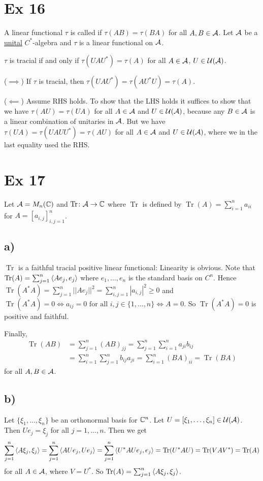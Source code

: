 \documentclass[10pt,english,a4paper]{article}
\theoremstyle{definition}
\let\emph\relax %
\DeclareMathOperator{\Tr}{Tr}
\begin{document}
\section*{Ex 16}
A linear functional $\tau$ is called \emph{tracial} if $\tau(AB)= \tau(BA)$ for
all $A,B \in \mathcal{A}$. Let
$\mathcal{A}$ be a \ul{unital} $C^*$-algebra and $\tau$ is a linear functional on $\mathcal{A}$. 

$\tau$ is tracial if and only if $\tau(UAU^*) = \tau(A)$ for all $A \in \mathcal{A}$,
$U \in \mathcal{U}(\mathcal{A})$.

($\implies$) If $\tau$ is tracial, then $\tau(UAU^*) = \tau(AU^*U)= \tau(A)$.

($\impliedby$) Assume RHS holds. To show that the LHS holds it suffices to 
show that we have $\tau(AU) = \tau(UA)$ for all $A \in \mathcal{A}$ and $U \in \mathcal{U}(\mathcal{A})$,
because any $B\in \mathcal{A}$ is a linear combination of unitaries in $\mathcal{A}$.
But we have $\tau(UA) = \tau(UAUU^*) = \tau(AU)$ for all $A \in \mathcal{A}$ and $U\in \mathcal{U}(\mathcal{A})$,
where we in the last equality used 
the RHS. 

\section*{Ex 17}
Let $\mathcal{A} = M_{n}(\mathbb{C})$ and 
$\Tr\colon \As\to\C$ where $\Tr$ is defined by 
$\Tr(A) = \sum_{i=1}^{n} a_{ii}$ for $A = [a_{i,j}]_{i,j=1}^{n}$.
\subsection*{a)}
$\Tr$ is a faithful tracial positive linear functional: Linearity is obvious.
Note that $\Tr(A)=\sum_{j=1}^{n}\ind{Ae_j,e_j}$ where $e_1,\ldots,e_n$ is the 
standard basis on $C^n$. Hence 
$\Tr(A^*A) = \sum_{j=1}^{n} ||Ae_j||^2 = \sum_{i,j=1}^{n} |a_{i,j}|^2 \geq 0$
and $\Tr(A^*A) = 0 \iff a_{ij}=0 \text{ for all } i,j\in\{1,\ldots,n\} \iff A  = 0$.
So $\Tr(A^*A) = 0$ is positive and faithful. 

Finally, 
\begin{align*}
\Tr(AB)&=\sum_{j=1}^{n} (AB)_{jj} = \sum_{j=1}^{n}\sum_{i=1}^{n}a_{ji}b_{ij} \\&=
\sum_{i=1}^{n}\sum_{j=1}^{n}b_{ij}a_{ji}  = \sum_{i=1}^{n}(BA)_{ii} = \Tr(BA)
\end{align*}
for all $A,B \in \mathcal{A}$.


\subsection*{b)}
Let $\{\xi_1,\ldots, \xi_n\}$ be an orthonormal basis for $\mathbb{C}^n$. Let 
$U = [\xi_1,\ldots, \xi_n] \in \mathcal{U}(\mathcal{A})$. Then $Ue_j = \xi_j$ for all 
$j=1,\ldots,n$. Then we get 
\begin{align*}
    \sum_{j=1}^{n} \ind{A\xi_j,\xi_j} = \sum_{j=1}^{n} \ind{AUe_j,Ue_j}
    =\sum_{j=1}^{n} \ind{U^*AUe_j,e_j} = \Tr(U^*AU) = \Tr(VAV^*) = \Tr(A)
\end{align*}
for all $A \in \mathcal{A}$, where $V = U^*$. So $\Tr(A) =\sum_{j=1}^{n} \ind{A\xi_j,\xi_j}$.
\end{document}
